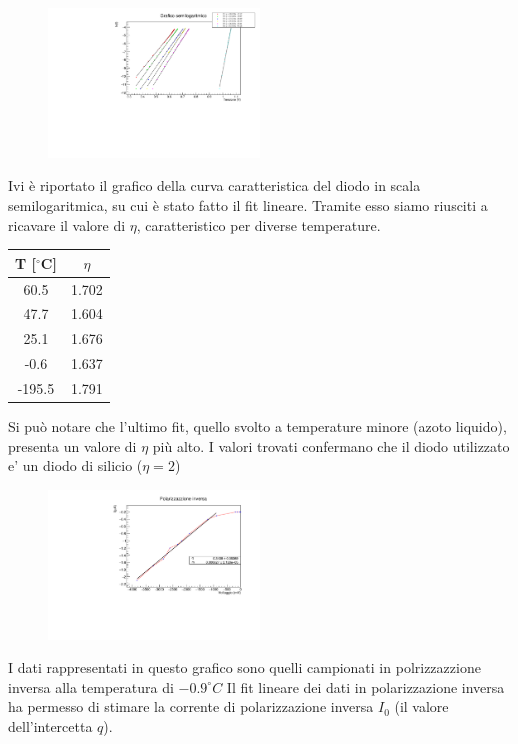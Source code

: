 \documentclass[10pt,twocolumn]{article}
\begin{document}
\begin{figure}[H] %
  \centering
  \includegraphics[width=0.5\textwidth]{scala_semilogaritmica.pdf} %
  \label{fig:I_V_}
\end{figure}
Ivi è riportato il grafico della curva caratteristica del diodo in scala semilogaritmica,
su cui è stato fatto il fit lineare. 
Tramite esso siamo riusciti a ricavare il valore di $\eta$, 
caratteristico per diverse temperature.

\begin{table}[H]
	\centering
	\begin{tabular}{|c|c|}
		\hline
		\textbf{T} [$^\circ$C] & \textbf{$\eta$} \\ \hline
    60.5 & 1.702 \\ \hline
    47.7 & 1.604 \\ \hline
    25.1 & 1.676 \\ \hline
    -0.6 & 1.637 \\ \hline
    -195.5 & 1.791 \\ \hline
	\end{tabular}
\end{table}
Si può notare che l'ultimo fit, quello svolto a temperature minore (azoto liquido), presenta un valore di $\eta$  più alto.
I valori trovati confermano che il diodo utilizzato e' un diodo di silicio ($\eta = 2$)

\begin{figure}[H] %
  \centering
  \includegraphics[width=0.5\textwidth]{pol_inv.pdf} %
  \label{fig:V}
\end{figure}
I dati rappresentati in questo grafico sono quelli campionati in polrizzazzione inversa alla temperatura di $-0.9^\circ C$
Il fit lineare dei dati in polarizzazione inversa ha permesso di stimare la corrente di polarizzazione inversa $I_0$ 
(il valore  dell'intercetta $q$).
\end{document}
